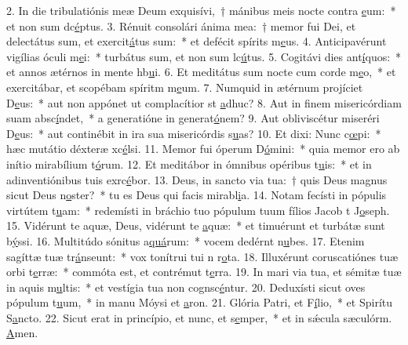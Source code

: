 2. In die tribulatiónis meæ Deum exquisívi,~† mánibus meis nocte contra \uline{e}um:~* et non sum dc\uline{é}ptus.
3. Rénuit consolári ánima mea:~† memor fui Dei, et delectátus sum, et exercit\uline{á}tus sum:~* et defécit spírits m\uline{e}us.
4. Anticipavérunt vigílias óculi m\uline{e}i:~* turbátus sum, et non sum lc\uline{ú}tus.
5. Cogitávi dies ant\uline{í}quos:~* et annos ætérnos in mente hb\uline{u}i.
6. Et meditátus sum nocte cum corde m\uline{e}o,~* et exercitábar, et scopébam spíritm m\uline{e}um.
7. Numquid in ætérnum projíciet D\uline{e}us:~* aut non appónet ut complacítior st \uline{a}dhuc?
8. Aut in finem misericórdiam suam absc\uline{í}ndet,~* a generatióne in generat\uline{ó}nem?
9. Aut obliviscétur miseréri D\uline{e}us:~* aut continébit in ira sua misericórdis s\uline{u}as?
10. Et dixi: Nunc c\uline{œ}pi:~* hæc mutátio déxteræ xc\uline{é}lsi.
11. Memor fui óperum D\uline{ó}mini:~* quia memor ero ab inítio mirabílium t\uline{ó}rum.
12. Et meditábor in ómnibus opéribus t\uline{u}is:~* et in adinventiónibus tuis exrc\uline{é}bor.
13. Deus, in sancto via tua:~† quis Deus magnus sicut Deus n\uline{o}ster?~* tu es Deus qui facis mirabl\uline{i}a.
14. Notam fecísti in pópulis virtútem t\uline{u}am:~* redemísti in bráchio tuo pópulum tuum fílios Jacob t J\uline{o}seph.
15. Vidérunt te aquæ, Deus, vidérunt te \uline{a}quæ:~* et timuérunt et turbátæ sunt b\uline{ý}ssi.
16. Multitúdo sónitus a\uline{quá}rum:~* vocem dedérnt n\uline{u}bes.
17. Etenim sagíttæ tuæ tr\uline{á}nseunt:~* vox tonítrui tui n r\uline{o}ta.
18. Illuxérunt coruscatiónes tuæ orbi t\uline{e}rræ:~* commóta est, et contrémut t\uline{e}rra.
19. In mari via tua, et sémitæ tuæ in aquis m\uline{u}ltis:~* et vestígia tua non cognsc\uline{é}ntur.
20. Deduxísti sicut oves pópulum t\uline{u}um,~* in manu Móysi et \uline{a}ron.
21. Glória Patri, et F\uline{í}lio,~* et Spirítu S\uline{a}ncto.
22. Sicut erat in princípio, et nunc, et s\uline{e}mper,~* et in sǽcula sæculórm. \uline{A}men.
